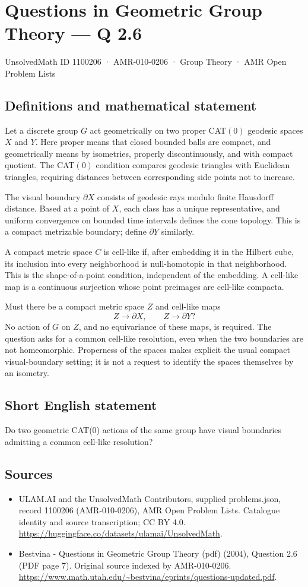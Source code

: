 \documentclass[11pt,a4paper]{article}
\begin{document}
\section*{Questions in Geometric Group Theory — Q 2.6}\label{1100206}
{\small UnsolvedMath ID 1100206 · AMR-010-0206 · Group Theory · AMR Open Problem Lists}
\subsection{Definitions and mathematical statement}
Let a discrete group $G$ act geometrically on two proper CAT$(0)$ geodesic spaces $X$ and $Y$. Here proper means that closed bounded balls are compact, and geometrically means by isometries, properly discontinuously, and with compact quotient. The CAT$(0)$ condition compares geodesic triangles with Euclidean triangles, requiring distances between corresponding side points not to increase.

The visual boundary $\partial X$ consists of geodesic rays modulo finite Hausdorff distance. Based at a point of $X$, each class has a unique representative, and uniform convergence on bounded time intervals defines the cone topology. This is a compact metrizable boundary; define $\partial Y$ similarly.

A compact metric space $C$ is cell-like if, after embedding it in the Hilbert cube, its inclusion into every neighborhood is null-homotopic in that neighborhood. This is the shape-of-a-point condition, independent of the embedding. A cell-like map is a continuous surjection whose point preimages are cell-like compacta.

Must there be a compact metric space $Z$ and cell-like maps
\[
 Z\longrightarrow\partial X,\qquad Z\longrightarrow\partial Y?
\]
No action of $G$ on $Z$, and no equivariance of these maps, is required. The question asks for a common cell-like resolution, even when the two boundaries are not homeomorphic. Properness of the spaces makes explicit the usual compact visual-boundary setting; it is not a request to identify the spaces themselves by an isometry.
\subsection{Short English statement}
Do two geometric CAT(0) actions of the same group have visual boundaries admitting a common cell-like resolution?
\subsection{Sources}
\begin{itemize}
\item[S1] ULAM.AI and the UnsolvedMath Contributors, supplied problems.json, record 1100206 (AMR-010-0206), AMR Open Problem Lists. Catalogue identity and source transcription; CC BY 4.0.
\url{https://huggingface.co/datasets/ulamai/UnsolvedMath}.
\item[S2] Bestvina - Questions in Geometric Group Theory (pdf) (2004), Question 2.6 (PDF page 7). Original source indexed by AMR-010-0206.
\url{https://www.math.utah.edu/~bestvina/eprints/questions-updated.pdf}.
\end{itemize}
\end{document}
